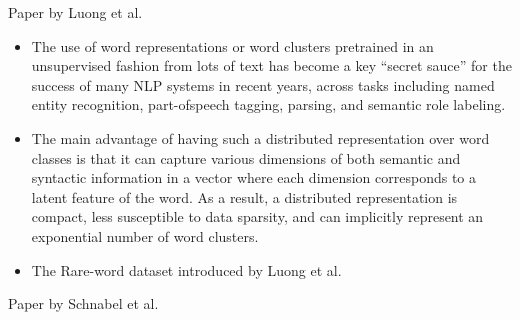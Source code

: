 \documentclass[../../Thesis.tex]{subfiles}
\begin{document}
Paper by Luong et al.\cite{luong2013better}
\begin{itemize}
\item{The use of word representations or word clusters
pretrained in an unsupervised fashion from lots of
text has become a key “secret sauce” for the success
of many NLP systems in recent years, across
tasks including named entity recognition, part-ofspeech
tagging, parsing, and semantic role labeling.}
\item{The main advantage of having such a distributed
representation over word classes is that it can capture
various dimensions of both semantic and syntactic
information in a vector where each dimension
corresponds to a latent feature of the word. As
a result, a distributed representation is compact,
less susceptible to data sparsity, and can implicitly
represent an exponential number of word clusters.}
\item{The Rare-word dataset introduced by Luong et al.}
\end{itemize}
Paper by Schnabel et al. \cite{schnabel2015evaluation}
\end{document}
